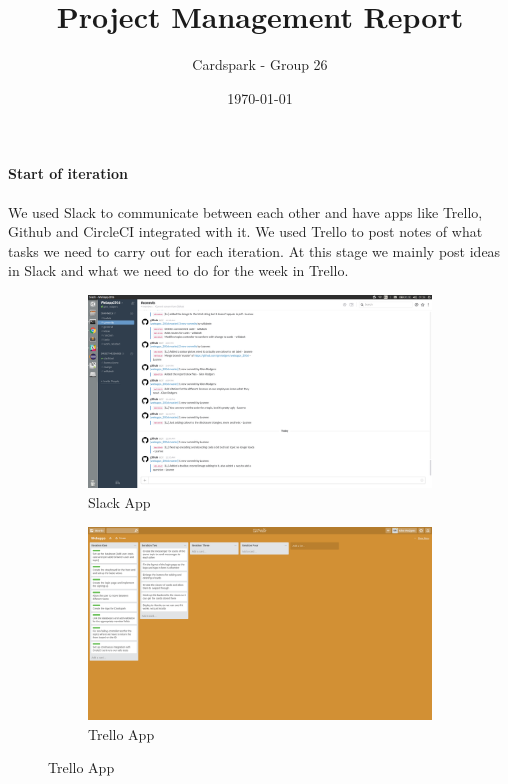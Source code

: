 \documentclass[a4wide, 10pt]{article}
\begin{document}
\title{Project Management Report}

\author{Cardspark - Group 26}

\date{\today}         %

\maketitle            %

\paragraph{Start of iteration}
We used Slack to communicate between each other and have apps like Trello, Github and CircleCI integrated with it.  We used Trello to post notes of what tasks we need to carry out for each iteration.  At this stage we mainly post ideas in Slack and what we need to do for the week in Trello.
\begin{figure}[h]
\centering
\begin{subfigure}{.5\textwidth}
  \centering
  	\includegraphics[scale=0.1]{slackstart.png} 
  \caption{Slack App}
  \label{fig:sub1}
\end{subfigure}%
\begin{subfigure}{.5\textwidth}
  \centering
  	\includegraphics[scale=0.1]{iterationstart.png} 
  \caption{Trello App}
  \label{fig:sub2}
\end{subfigure}
\label{fig:test}
\end{figure}
\vspace*{-\baselineskip} 
\end{document}
